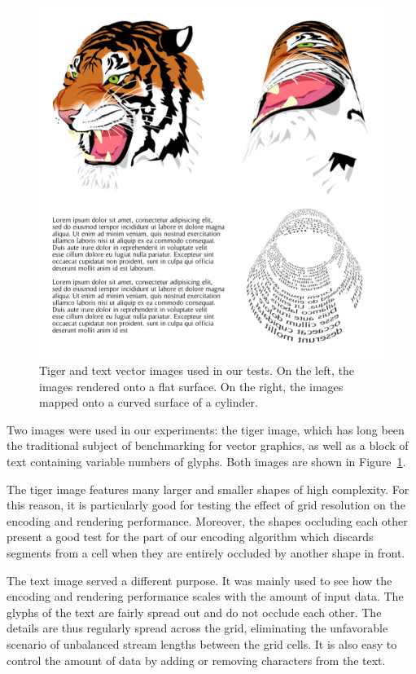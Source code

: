 \documentclass[11pt,a4paper,twoside]{article}
\begin{document}
\begin {figure} [b!]
	\centering
	\includegraphics[width=0.8\columnwidth] {figures/screenshots}
	\caption {Tiger and text vector images used in our tests. On the left, the images rendered onto a flat surface. On the right, the images mapped onto a curved surface of a cylinder.}
	\label {fig:screenshots}
\end {figure}

Two images were used in our experiments: the tiger image, which has long been the traditional subject of benchmarking for vector graphics, as well as a block of text containing variable numbers of glyphs. Both images are shown in Figure~\ref{fig:screenshots}.

The tiger image features many larger and smaller shapes of high complexity. For this reason, it is particularly good for testing the effect of grid resolution on the encoding and rendering performance. Moreover, the shapes occluding each other present a good test for the part of our encoding algorithm which discards segments from a cell when they are entirely occluded by another shape in front.

The text image served a different purpose. It was mainly used to see how the encoding and rendering performance scales with the amount of input data. The glyphs of the text are fairly spread out and do not occlude each other. The details are thus regularly spread across the grid, eliminating the unfavorable scenario of unbalanced stream lengths between the grid cells. It is also easy to control the amount of data by adding or removing characters from the text.
\end{document}
